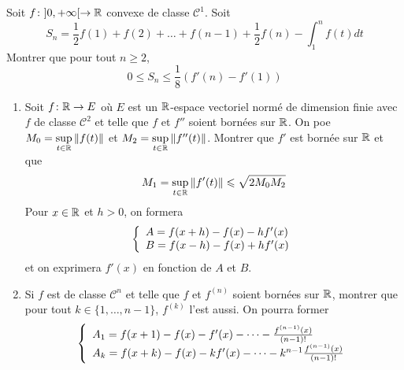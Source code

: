 \documentclass[12pt]{article}
\begin{document}
\begin{exercise}
	Soit $f\colon]0,+\infty[\to\mathbb{R}$ convexe de classe $\mathcal{C}^{1}$. Soit 
	$$S_{n}=\frac{1}{2}f(1)+f(2)+\dots+f(n-1)+\frac{1}{2}f(n)-\int_{1}^{n}f(t)dt$$
	Montrer que pour tout $n\geqslant2$, 
	$$0\leqslant S_{n}\leqslant\frac{1}{8}(f'(n)-f'(1))$$
\end{exercise}

\begin{exercise}
	\phantom{}
	\begin{enumerate}
		\item Soit $f\colon\mathbb{R}\to E$ où $E$ est un $\mathbb{R}$-espace vectoriel normé de dimension finie avec $f$ de classe $\mathcal{C}^{2}$ et telle que $f$ et $f''$ soient bornées sur $\mathbb{R}$. On poe $M_{0}=\sup\limits_{t\in\mathbb{R}}\Vert f(t)\Vert$ et $M_{2}=\sup\limits_{t\in\mathbb{R}}\Vert f''(t)\Vert$. Montrer que $f'$ est bornée sur $\mathbb{R}$ et que 
		$$M_{1}=\sup\limits_{t\in\mathbb{R}}\Vert f'(t)\Vert\leqslant\sqrt{2M_{0}M_{2}}$$
		Pour $x\in\mathbb{R}$ et $h>0$, on formera 
		$$
		\left\{
			\begin{array}[]{l}
				A=f(x+h)-f(x)-hf'(x)\\
				B=f(x-h)-f(x)+hf'(x)
			\end{array}
		\right.
		$$
		et on exprimera $f'(x)$ en fonction de $A$ et $B$.

		\item Si $f$ est de classe $\mathcal{C}^{n}$ et telle que $f$ et $f^{(n)}$ soient bornées sur $\mathbb{R}$, montrer que pour tout $k\in\{1,\dots,n-1\}$, $f^{(k)}$ l'est aussi. On pourra former 
		$$
		\left\{
			\begin{array}[]{l}
				A_{1}=f(x+1)-f(x)-f'(x)-\dots-\frac{f^{(n-1)}(x)}{(n-1)!}\\
				A_{k}=f(x+k)-f(x)-kf'(x)-\dots-k^{n-1}\frac{f^{(n-1)}(x)}{(n-1)!}
			\end{array}
		\right.
		$$
	\end{enumerate}
\end{exercise}
\end{document}
